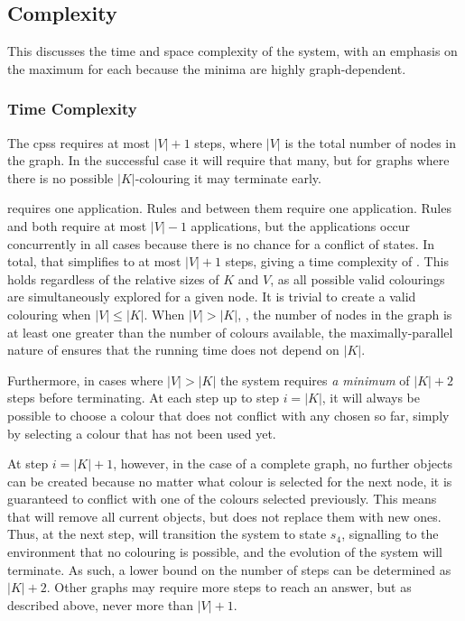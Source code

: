 \subsection{\label{sec:gcol:complexity}Complexity}
This  discusses the time and space complexity of the system, with an emphasis on the maximum for each because the minima are highly graph-dependent.

\subsubsection{\label{sec:gcol:timecomplexity}Time Complexity}
The \glspl{cps} requires at most \(|V| + 1\) steps, where \(|V|\) is the total number of nodes in the graph.  In the successful case it will require that many, but for graphs where there is no possible \(|K|\)-colouring it may terminate early.

 requires one application.  Rules  and  between them require one application.  Rules  and  both require at most \(|V| - 1\) applications, but the applications occur concurrently in all cases because there is no chance for a conflict of states.  In total, that simplifies to at most \(|V| + 1\) steps, giving a time complexity of .  This holds regardless of the relative sizes of \(K\) and \(V\), as all possible valid colourings are simultaneously explored for a given node.  It is trivial to create a valid colouring when \(|V| \leq |K|\).   When \(|V| > |K|\), \ie{}, the number of nodes in the graph is at least one greater than the number of colours available, the maximally-parallel nature of  ensures that the running time does not depend on \(|K|\).

Furthermore, in cases where \(|V| > |K|\) the system requires \emph{a minimum} of \(|K| + 2\) steps before terminating.  At each step up to step \(i = |K|\), it will always be possible to choose a colour that does not conflict with any chosen so far, simply by selecting a colour that has not been used yet.  

At step \(i = |K| + 1\), however, in the case of a complete graph, no further \bo{} objects can be created because no matter what colour is selected for the next node, it is guaranteed to conflict with one of the colours selected previously.  This means that  will remove all current \bo{} objects, but  does not replace them with new ones.  Thus, at the next step,  will transition the system to state \(s_4\), signalling to the environment that no colouring is possible, and the evolution of the system will terminate.  As such, a lower bound on the number of steps can be determined as \(|K| + 2\).  Other graphs may require more steps to reach an answer, but as described above, never more than \(|V| + 1\).

